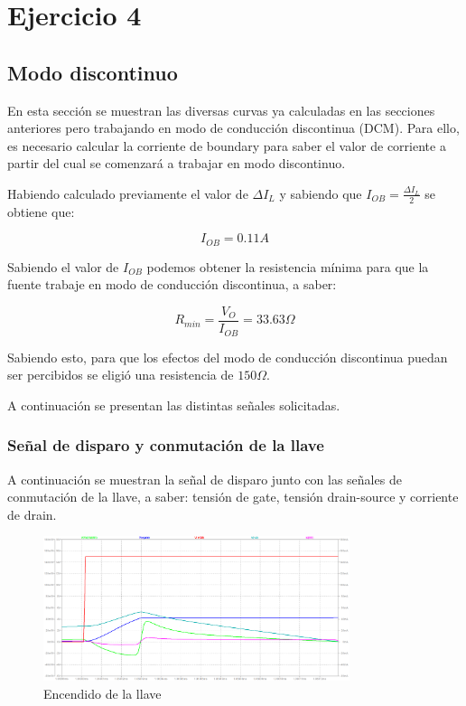 \documentclass[e4_tp1_main.tex]{subfiles}
\begin{document}
	
	\section{Ejercicio 4}
	
	\subsection{Modo discontinuo}
	En esta sección se muestran las diversas curvas ya calculadas en las secciones anteriores pero trabajando en modo de conducción discontinua (DCM). Para ello, es necesario calcular la corriente de boundary para saber el valor de corriente a partir del cual se comenzará a trabajar en modo discontinuo.
	
	Habiendo calculado previamente el valor de $\Delta I_{L}$ y sabiendo que $I_{OB}=\frac{\Delta I_{L}}{2}$ se obtiene que:
	
	\begin{equation}
	I_{OB}=0.11A    
	\end{equation}
	
	Sabiendo el valor de $I_{OB}$ podemos obtener la resistencia mínima para que la fuente trabaje en modo de conducción discontinua, a saber:
	
	\begin{equation}
	R_{min}=\frac{V_O}{I_{OB}}=33.63\Omega
	\end{equation}
	
	Sabiendo esto, para que los efectos del modo de conducción discontinua puedan ser percibidos se eligió una resistencia de $150\Omega$.
	
	A continuación se presentan las distintas señales solicitadas.
	
	\subsubsection{Señal de disparo y conmutación de la llave}
	A continuación se muestran la señal de disparo junto con las señales de conmutación de la llave, a saber: tensión de gate, tensión drain-source y corriente de drain.
	
	\begin{figure}[H]
		\centering
		\includegraphics[width=0.8\textwidth]{images/ej4/fig1.png}
		\caption{Encendido de la llave}
		\label{fig:my_label}
	\end{figure}
	
\end{document}

